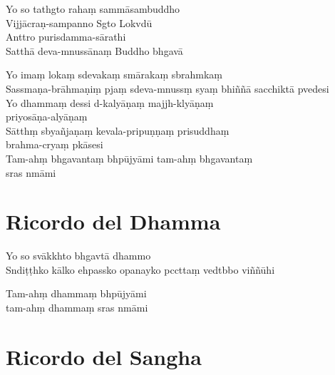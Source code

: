 \begin{leader}
\end{leader}

Yo so tathgto rahaṃ sammāsambuddho\\
Vijjācraṇ-sampanno Sgto Lokvdū\\
Anttro purisdamma-sārathi\\
Satthā deva-mnussānaṃ Buddho bhgavā

Yo imaṃ lokaṃ sdevakaṃ smārakaṃ sbrahmkaṃ\\
Sassmaṇa-brāhmaṇiṃ pjaṃ sdeva-mnussṃ syaṃ bhiññā sacchiktā pvedesi\\
Yo dhammaṃ dessi d-kalyāṇaṃ majjh-klyāṇaṃ\\
priyosāṇa-alyāṇaṃ\\
Sātthṃ sbyañjaṇaṃ kevala-pripuṇṇaṃ prisuddhaṃ\\
brahma-cryaṃ pkāsesi\\

Tam-ahṃ bhgavantaṃ bhpūjyāmi tam-ahṃ bhgavantaṃ\\
sras nmāmi 

\chapter{Ricordo del Dhamma}     %

\begin{leader}
\end{leader}

Yo so svākkhto bhgavtā dhammo\\
Sndiṭṭhko kālko ehpassko opanayko pccttaṃ vedtbbo viññūhi

Tam-ahṃ dhammaṃ bhpūjyāmi\\
\vin tam-ahṃ dhammaṃ sras nmāmi 

\enlargethispage{\baselineskip}
\clearpage

\chapter{Ricordo del Sangha}     %

